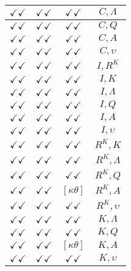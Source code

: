 \documentclass[a4paper,10pt]{article}
\begin{document}
\begin{longtable}{|c|c|c|c|}
\hline
$\checkmark\checkmark$ & $\checkmark\checkmark$ & $\checkmark\checkmark$ & ${C},{\Lambda}$ \\
\hline
$\checkmark\checkmark$ & $\checkmark\checkmark$ & $\checkmark\checkmark$ & ${C},{Q}$ \\
\hline
$\checkmark\checkmark$ & $\checkmark\checkmark$ & $\checkmark\checkmark$ & ${C},{A}$ \\
\hline
$\checkmark\checkmark$ & $\checkmark\checkmark$ & $\checkmark\checkmark$ & ${C},{\upsilon}$ \\
\hline
$\checkmark\checkmark$ & $\checkmark\checkmark$ & $\checkmark\checkmark$ & ${I},{R^{K}}$ \\
\hline
$\checkmark\checkmark$ & $\checkmark\checkmark$ & $\checkmark\checkmark$ & ${I},{K}$ \\
\hline
$\checkmark\checkmark$ & $\checkmark\checkmark$ & $\checkmark\checkmark$ & ${I},{\Lambda}$ \\
\hline
$\checkmark\checkmark$ & $\checkmark\checkmark$ & $\checkmark\checkmark$ & ${I},{Q}$ \\
\hline
$\checkmark\checkmark$ & $\checkmark\checkmark$ & $\checkmark\checkmark$ & ${I},{A}$ \\
\hline
$\checkmark\checkmark$ & $\checkmark\checkmark$ & $\checkmark\checkmark$ & ${I},{\upsilon}$ \\
\hline
$\checkmark\checkmark$ & $\checkmark\checkmark$ & $\checkmark\checkmark$ & ${R^{K}},{K}$ \\
\hline
$\checkmark\checkmark$ & $\checkmark\checkmark$ & $\checkmark\checkmark$ & ${R^{K}},{\Lambda}$ \\
\hline
$\checkmark\checkmark$ & $\checkmark\checkmark$ & $\checkmark\checkmark$ & ${R^{K}},{Q}$ \\
\hline
$\checkmark\checkmark$ & $\checkmark\checkmark$ & $[\kappa \theta ]$ & ${R^{K}},{A}$ \\
\hline
$\checkmark\checkmark$ & $\checkmark\checkmark$ & $\checkmark\checkmark$ & ${R^{K}},{\upsilon}$ \\
\hline
$\checkmark\checkmark$ & $\checkmark\checkmark$ & $\checkmark\checkmark$ & ${K},{\Lambda}$ \\
\hline
$\checkmark\checkmark$ & $\checkmark\checkmark$ & $\checkmark\checkmark$ & ${K},{Q}$ \\
\hline
$\checkmark\checkmark$ & $\checkmark\checkmark$ & $[\kappa \theta ]$ & ${K},{A}$ \\
\hline
$\checkmark\checkmark$ & $\checkmark\checkmark$ & $\checkmark\checkmark$ & ${K},{\upsilon}$ \\

\end{longtable}
\end{document}
